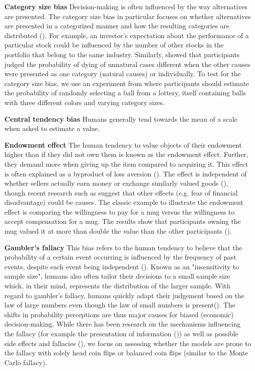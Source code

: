 \par \textbf{Category size bias} Decision-making is often influenced by the way alternatives are presented. The category size bias in particular focuses on whether alternatives are presented in a categorized manner and how the resulting categories are distributed (\cite{isaac2014judging}). For example, an investor's expectation about the performance of a particular stock could be influenced by the number of other stocks in the portfolio that belong to the same industry. Similarly, \cite{tversky1994support} showed that participants judged the probability of dying of unnatural cases different when the other causes were presented as one category (natural causes) or individually. To test for the category size bias, we use an experiment from \cite{isaac2014judging} where participants should estimate the probability of randomly selecting a ball from a lottery, itself containing balls with three different colors and varying category sizes.

\par \textbf{Central tendency bias} Humans generally tend towards the mean of a scale when asked to estimate a value.

\par \textbf{Endowment effect} The human tendency to value objects of their endowment higher than if they did not own them is known as the endowment effect. Further, they demand more when giving up the item compared to acquiring it. This effect is often explained as a byproduct of loss aversion (\cite{kahneman1990experimental}). The effect is independent of whether sellers actually earn money or exchange similarly valued goods (\cite{knetsch1989endowment}), though recent research such as \cite{weaver2012reference} suggest that other effects (e.g. fear of financial disadvantage) could be causes. The classic example to illustrate the endowment effect is comparing the willingness to pay for a mug versus the willingness to accept compensation for a mug. The results show that participants owning the mug valued it at more than double the value than the other participants (\cite{kahneman1990experimental}).

\par \textbf{Gambler's fallacy} This bias refers to the human tendency to believe that the probability of a certain event occurring is influenced by the frequency of past events, despite each event being independent (\cite{bar1991perception,kovic2019gambler}). Known as an "insensitivity to sample size", humans also often tailor their decisions to a small sample size which, in their mind, represents the distribution of the larger sample. With regard to gambler's fallacy, humans quickly adapt their judgement based on the law of large numbers even though the law of small numbers is present(\cite{tversky1974judgment}). The shifts in probability perceptions are thus major causes for biased (economic) decision-making. While there has been research on the mechanisms influencing the fallacy (for example the presentation of information (\cite{barron2010role})) as well as possible side effects and fallacies (\cite{kovic2019gambler}), we focus on assessing whether the models are prone to the fallacy with solely head coin flips or balanced coin flips (similar to the Monte Carlo fallacy).

